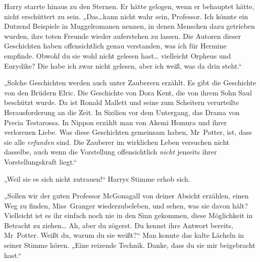 Harry starrte hinaus zu den Sternen. Er hätte gelogen, wenn er behauptet hätte, nicht erschüttert zu sein. „Das…kann nicht wahr sein, Professor. Ich könnte ein Dutzend Beispiele in Muggelromanen nennen, in denen Menschen dazu getrieben wurden, ihre toten Freunde wieder auferstehen zu lassen. Die Autoren dieser Geschichten haben offensichtlich genau verstanden, was ich für Hermine empfinde. Obwohl du sie wohl nicht gelesen hast… vielleicht Orpheus und Eurydike? Die habe ich zwar nicht gelesen, aber ich weiß, was da drin steht.“

„Solche Geschichten werden auch unter Zauberern erzählt. Es gibt die Geschichte von den Brüdern Elric. Die Geschichte von Dora Kent, die von ihrem Sohn Saul beschützt wurde. Da ist Ronald Mallett und seine zum Scheitern verurteilte Herausforderung an die Zeit. In Sizilien vor dem Untergang, das Drama von Precia Testarossa. In Nippon erzählt man von Akemi Homura und ihrer verlorenen Liebe. Was diese Geschichten gemeinsam haben, Mr~Potter, ist, dass sie alle \emph{erfunden} sind. Die Zauberer im wirklichen Leben versuchen nicht dasselbe, auch wenn die Vorstellung offensichtlich \emph{nicht} jenseits ihrer Vorstellungskraft liegt.“

„Weil sie es sich nicht zutrauen!“ Harrys Stimme erhob sich.

„Sollen wir der guten Professor McGonagall von deiner Absicht erzählen, einen Weg zu finden, Miss~Granger wiederzubeleben, und sehen, was sie davon hält? Vielleicht ist es ihr einfach noch nie in den Sinn gekommen, diese Möglichkeit in Betracht zu ziehen… Ah, aber du zögerst. Du kennst ihre Antwort bereits, Mr~Potter. Weißt du, warum du sie weißt?“ Man konnte das kalte Lächeln in seiner Stimme hören. „Eine reizende Technik. Danke, dass du sie mir beigebracht hast.“

